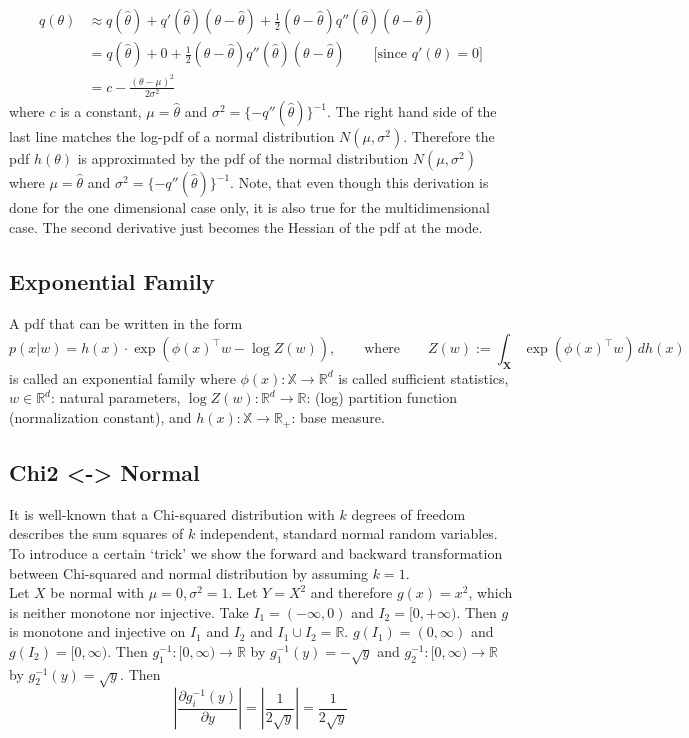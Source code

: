 \begin{align}
	q(\theta) &\approx q(\hat{\theta}) + q'(\hat{\theta})(\theta - \hat{\theta}) + \frac{1}{2}(\theta- \hat{\theta})q''(\hat{\theta}) (\theta - \hat{\theta})\\
	&= 	q(\hat{\theta}) + 0 +  \frac{1}{2}(\theta- \hat{\theta})q''(\hat{\theta}) (\theta - \hat{\theta}) \qquad \text{[since } q'(\theta) = 0]\\
	&= c - \frac{(\theta - \mu)^2}{2\sigma^2}
\end{align}
where $c$ is a constant, $\mu = \hat{\theta}$ and $\sigma^2 = \{-q''(\hat{\theta})\}^{-1}$. The right hand side of the last line matches the log-pdf of a normal distribution $N(\mu, \sigma^2)$. Therefore the pdf $h(\theta)$ is approximated by the pdf of the normal distribution $N(\mu, \sigma^2)$ where $\mu = \hat{\theta}$ and $\sigma^2 = \{-q''(\hat{\theta})\}^{-1}$. Note, that even though this derivation is done for the one dimensional case only, it is also true for the multidimensional case. The second derivative just becomes the Hessian of the pdf at the mode.

\subsection{Exponential Family}

A pdf that can be written in the form 
\begin{equation*}\label{EF}
p(x \vert w) = h(x)\cdot \exp\left(\phi(x)^\top w - \log Z(w) \right), \qquad\text{where}\qquad Z(w):= \int_{\mathbf{X}} \exp\left(\phi(x)^\top w\right) \,dh(x)
\end{equation*}
is called an exponential family where $\phi(x): \mathbb{X} \rightarrow \mathbb{R}^d$ is called sufficient statistics, $w \in \mathbb{R}^d$: natural parameters, $\log Z(w): \mathbb{R}^d \rightarrow \mathbb{R}$: (log) partition function (normalization constant), and $h(x): \mathbb{X} \rightarrow \mathbb{R}_{+}$: base measure.

\subsection{Chi2 <-> Normal}
\label{subsec:chi2-normal}

It is well-known that a Chi-squared distribution with $k$ degrees of freedom describes the sum squares of $k$ independent, standard normal random variables. To introduce a certain `trick' we show the forward and backward transformation between Chi-squared and normal distribution by assuming $k=1$.\\
Let $X$ be normal with $\mu = 0, \sigma^2 = 1$. Let $Y = X^2$ and therefore $g(x) = x^2$, which is neither monotone nor injective. Take $I_1 = (-\infty, 0)$ and $I_2 = [0, +\infty)$. Then $g$ is monotone and injective on $I_1$ and $I_2$ and $I_1 \cup I_2 = \mathbb{R}$. $g(I_1) = (0, \infty)$ and $g(I_2) = [0, \infty)$. Then $g_1^{-1}: [0, \infty) \rightarrow \mathbb{R}$ by $g_1^{-1}(y) = -\sqrt{y}$ and $g_2^{-1}: [0, \infty) \rightarrow \mathbb{R}$ by $g_2^{-1}(y) = \sqrt{y}$. Then
$$\left\vert \frac{\partial g_i^{-1}(y)}{\partial y} \right\vert = \left\vert \frac{1}{2 \sqrt{y}} \right\vert = \frac{1}{2 \sqrt{y}}$$

